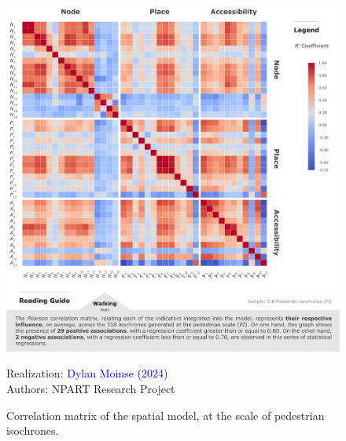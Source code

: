\begin{refsegment}
\begin{figure}[h!]\vspace*{4pt}
    \caption{Correlation matrix of the spatial model, at the scale of pedestrian isochrones.}
    \label{fig-chap6:correlations-indicateurs-independants-PI}
    \centerline{\includegraphics[width=1\columnwidth]{src/Figures/Chap-6/EN_NPART_Matrice_Correlation_PI.pdf}}
    \vspace{5pt}
    \begin{flushright}\scriptsize{
    Realization: \textcolor{blue}{Dylan Moinse (2024)}
    \\
    Authors: \acrshort{NPART} Research Project
    }\end{flushright}
\end{figure}


\end{refsegment}
